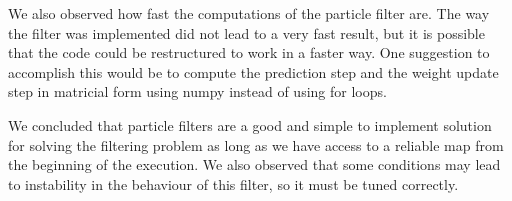 \documentclass[journal]{IEEEtran}
\begin{document}
We also observed how fast the computations of the particle filter are. The way the filter was implemented did not lead to a very fast result, but it is possible that the code could be restructured to work in a faster way. One suggestion to accomplish this would be to compute the prediction step and the weight update step in matricial form using numpy instead of using for loops.

We concluded that particle filters are a good and simple to implement solution for solving the filtering problem as long as we have access to a reliable map from the beginning of the execution. We also observed that some conditions may lead to instability in the behaviour of this filter, so it must be tuned correctly.


%
%
\end{document}
